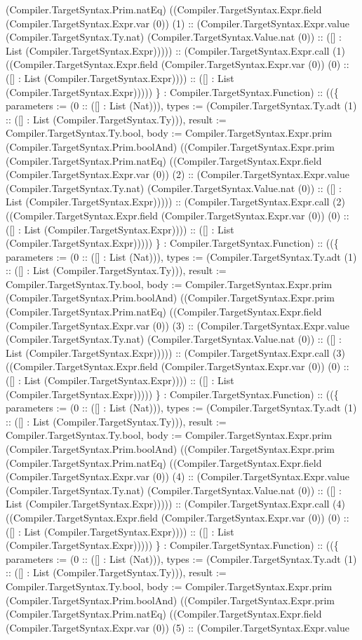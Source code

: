 \documentclass[11pt]{article}
\begin{document}
(Compiler.TargetSyntax.Prim.natEq) ((Compiler.TargetSyntax.Expr.field (Compiler.TargetSyntax.Expr.var (0)) (1) :: (Compiler.TargetSyntax.Expr.value (Compiler.TargetSyntax.Ty.nat) (Compiler.TargetSyntax.Value.nat (0)) :: ([] : List (Compiler.TargetSyntax.Expr))))) :: (Compiler.TargetSyntax.Expr.call (1) ((Compiler.TargetSyntax.Expr.field (Compiler.TargetSyntax.Expr.var (0)) (0) :: ([] : List (Compiler.TargetSyntax.Expr)))) :: ([] : List (Compiler.TargetSyntax.Expr))))) \} : Compiler.TargetSyntax.Function) :: ((\{ parameters := (0 :: ([] : List (Nat))), types := (Compiler.TargetSyntax.Ty.adt (1) :: ([] : List (Compiler.TargetSyntax.Ty))), result := Compiler.TargetSyntax.Ty.bool, body := Compiler.TargetSyntax.Expr.prim (Compiler.TargetSyntax.Prim.boolAnd) ((Compiler.TargetSyntax.Expr.prim (Compiler.TargetSyntax.Prim.natEq) ((Compiler.TargetSyntax.Expr.field (Compiler.TargetSyntax.Expr.var (0)) (2) :: (Compiler.TargetSyntax.Expr.value (Compiler.TargetSyntax.Ty.nat) (Compiler.TargetSyntax.Value.nat (0)) :: ([] : List (Compiler.TargetSyntax.Expr))))) :: (Compiler.TargetSyntax.Expr.call (2) ((Compiler.TargetSyntax.Expr.field (Compiler.TargetSyntax.Expr.var (0)) (0) :: ([] : List (Compiler.TargetSyntax.Expr)))) :: ([] : List (Compiler.TargetSyntax.Expr))))) \} : Compiler.TargetSyntax.Function) :: ((\{ parameters := (0 :: ([] : List (Nat))), types := (Compiler.TargetSyntax.Ty.adt (1) :: ([] : List (Compiler.TargetSyntax.Ty))), result := Compiler.TargetSyntax.Ty.bool, body := Compiler.TargetSyntax.Expr.prim (Compiler.TargetSyntax.Prim.boolAnd) ((Compiler.TargetSyntax.Expr.prim (Compiler.TargetSyntax.Prim.natEq) ((Compiler.TargetSyntax.Expr.field (Compiler.TargetSyntax.Expr.var (0)) (3) :: (Compiler.TargetSyntax.Expr.value (Compiler.TargetSyntax.Ty.nat) (Compiler.TargetSyntax.Value.nat (0)) :: ([] : List (Compiler.TargetSyntax.Expr))))) :: (Compiler.TargetSyntax.Expr.call (3) ((Compiler.TargetSyntax.Expr.field (Compiler.TargetSyntax.Expr.var (0)) (0) :: ([] : List (Compiler.TargetSyntax.Expr)))) :: ([] : List (Compiler.TargetSyntax.Expr))))) \} : Compiler.TargetSyntax.Function) :: ((\{ parameters := (0 :: ([] : List (Nat))), types := (Compiler.TargetSyntax.Ty.adt (1) :: ([] : List (Compiler.TargetSyntax.Ty))), result := Compiler.TargetSyntax.Ty.bool, body := Compiler.TargetSyntax.Expr.prim (Compiler.TargetSyntax.Prim.boolAnd) ((Compiler.TargetSyntax.Expr.prim (Compiler.TargetSyntax.Prim.natEq) ((Compiler.TargetSyntax.Expr.field (Compiler.TargetSyntax.Expr.var (0)) (4) :: (Compiler.TargetSyntax.Expr.value (Compiler.TargetSyntax.Ty.nat) (Compiler.TargetSyntax.Value.nat (0)) :: ([] : List (Compiler.TargetSyntax.Expr))))) :: (Compiler.TargetSyntax.Expr.call (4) ((Compiler.TargetSyntax.Expr.field (Compiler.TargetSyntax.Expr.var (0)) (0) :: ([] : List (Compiler.TargetSyntax.Expr)))) :: ([] : List (Compiler.TargetSyntax.Expr))))) \} : Compiler.TargetSyntax.Function) :: ((\{ parameters := (0 :: ([] : List (Nat))), types := (Compiler.TargetSyntax.Ty.adt (1) :: ([] : List (Compiler.TargetSyntax.Ty))), result := Compiler.TargetSyntax.Ty.bool, body := Compiler.TargetSyntax.Expr.prim (Compiler.TargetSyntax.Prim.boolAnd) ((Compiler.TargetSyntax.Expr.prim (Compiler.TargetSyntax.Prim.natEq) ((Compiler.TargetSyntax.Expr.field (Compiler.TargetSyntax.Expr.var (0)) (5) :: (Compiler.TargetSyntax.Expr.value 
\end{document}
